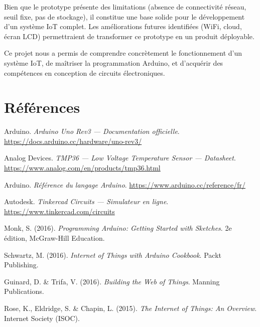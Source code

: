 \documentclass[12pt, a4paper]{article}
\begin{document}
Bien que le prototype présente des limitations (absence de connectivité réseau, seuil fixe, pas de stockage), il constitue une base solide pour le développement d'un système IoT complet. Les améliorations futures identifiées (WiFi, cloud, écran LCD) permettraient de transformer ce prototype en un produit déployable.

Ce projet nous a permis de comprendre concrètement le fonctionnement d'un système IoT, de maîtriser la programmation Arduino, et d'acquérir des compétences en conception de circuits électroniques.

\section*{Références}

\begin{enumerate}[label={[\arabic*]}]
    \item Arduino. \textit{Arduino Uno Rev3 — Documentation officielle}. \url{https://docs.arduino.cc/hardware/uno-rev3/}
    \item Analog Devices. \textit{TMP36 — Low Voltage Temperature Sensor — Datasheet}. \url{https://www.analog.com/en/products/tmp36.html}
    \item Arduino. \textit{Référence du langage Arduino}. \url{https://www.arduino.cc/reference/fr/}
    \item Autodesk. \textit{Tinkercad Circuits — Simulateur en ligne}. \url{https://www.tinkercad.com/circuits}
    \item Monk, S. (2016). \textit{Programming Arduino: Getting Started with Sketches}. 2e édition, McGraw-Hill Education.
    \item Schwartz, M. (2016). \textit{Internet of Things with Arduino Cookbook}. Packt Publishing.
    \item Guinard, D. \& Trifa, V. (2016). \textit{Building the Web of Things}. Manning Publications.
    \item Rose, K., Eldridge, S. \& Chapin, L. (2015). \textit{The Internet of Things: An Overview}. Internet Society (ISOC).
\end{enumerate}
\end{document}
